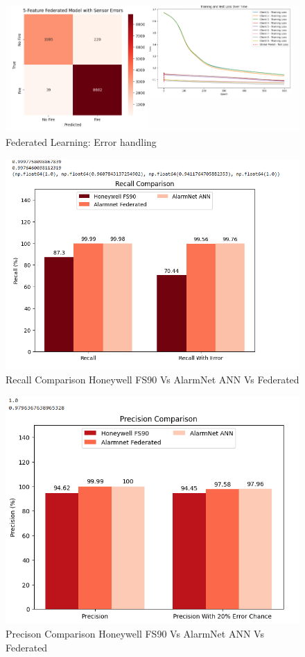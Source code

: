 \documentclass[conference]{IEEEtran}
\begin{document}
\begin{figure}
    \centering
    \includegraphics[width=1\linewidth]{images/FedHandling.png}
    \caption{Federated Learning: Error handling}
    \label{fig:6.2}
\end{figure}

\begin{figure}
    \centering
    \includegraphics[width=0.75\linewidth]{images/Recall.png}
    \caption{Recall Comparison Honeywell FS90 Vs AlarmNet ANN Vs Federated}
    \label{fig:7.0}
\end{figure}

\begin{figure}
    \centering
    \includegraphics[width=0.75\linewidth]{images/PrecisionComparison.png}
    \caption{Precison Comparison Honeywell FS90 Vs AlarmNet ANN Vs Federated}
    \label{fig:7.1}
\end{figure}
\end{document}
